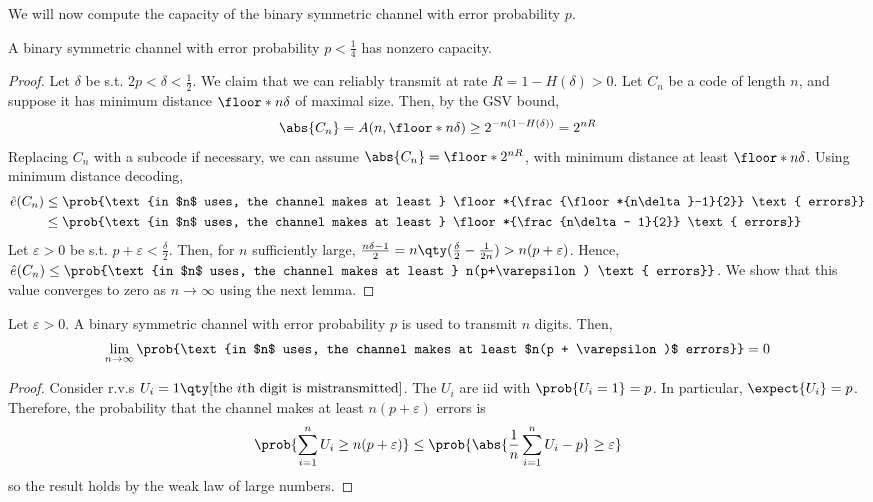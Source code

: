 We will now compute the capacity of the binary symmetric channel with error probability $p$.
\begin{proposition}
    A binary symmetric channel with error probability $p < \frac{1}{4}$ has nonzero capacity.
\end{proposition}
\begin{proof}
    Let $\delta$ be s.t. $2p < \delta < \frac{1}{2}$.
    We claim that we can reliably transmit at rate $R = 1 - H(\delta) > 0$.
    Let $C_n$ be a code of length $n$, and suppose it has minimum distance $\floor*{n\delta}$ of maximal size.
    Then, by the GSV bound,
    \begin{align*}
        \abs{C_n} = A(n, \floor*{n\delta}) \geq 2^{-n(1-H(\delta))} = 2^{nR}
    \end{align*}
    Replacing $C_n$ with a subcode if necessary, we can assume $\abs{C_n} = \floor*{2^{nR}}$, with minimum distance at least $\floor*{n\delta}$.
    Using minimum distance decoding,
    \begin{align*}
        \hat e(C_n) &\leq \prob{\text{in $n$ uses, the channel makes at least } \floor*{\frac{\floor*{n\delta}-1}{2}} \text{ errors}} \\
        &\leq \prob{\text{in $n$ uses, the channel makes at least } \floor*{\frac{n\delta - 1}{2}} \text{ errors}}
    \end{align*}
    Let $\varepsilon > 0$ be s.t. $p + \varepsilon < \frac{\delta}{2}$.
    Then, for $n$ sufficiently large, $\frac{n\delta - 1}{2} = n\qty(\frac{\delta}{2} - \frac{1}{2n}) > n(p + \varepsilon)$.
    Hence, $\hat e(C_n) \leq \prob{\text{in $n$ uses, the channel makes at least } n(p+\varepsilon) \text{ errors}}$.
    We show that this value converges to zero as $n \to \infty$ using the next lemma.
\end{proof}
\begin{lemma}
    Let $\varepsilon > 0$.
    A binary symmetric channel with error probability $p$ is used to transmit $n$ digits.
    Then,
    \begin{align*}
        \lim_{n \to \infty} \prob{\text{in $n$ uses, the channel makes at least $n(p + \varepsilon)$ errors}} = 0
    \end{align*}
\end{lemma}
\begin{proof}
    Consider r.v.s $U_i = 1\qty[\text{the $i$th digit is mistransmitted}]$.
    The $U_i$ are iid with $\prob{U_i = 1} = p$.
    In particular, $\expect{U_i} = p$.
    Therefore, the probability that the channel makes at least $n(p + \varepsilon)$ errors is
    \begin{align*}
        \prob{\sum_{i=1}^n U_i \geq n(p + \varepsilon)} \leq \prob{\abs{\frac{1}{n} \sum_{i=1}^n U_i - p} \geq \varepsilon}
    \end{align*}
    so the result holds by the weak law of large numbers.
\end{proof}

